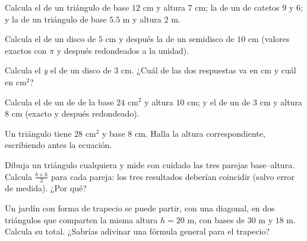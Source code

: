 \begin{exercise}[$\star$]\label{exo:g7:areas:3}
Calcula el  de un triángulo de base $12$ cm y altura $7$ cm;
la de un  de catetos $9$ y $6$; y la de un triángulo de base
$5.5$ m y altura $2$ m.
\end{exercise}

\begin{exercise}[$\star$]\label{exo:g7:areas:4}
Calcula el  de un disco de  $5$ cm y después la de un semidisco de
 $10$ cm (valores exactos con $\pi$ y después redondeados a la unidad).
\end{exercise}

\begin{exercise}[$\star$]\label{exo:g7:areas:5}
Calcula el  \emph{y} el  de un disco de  $3$ cm.
¿Cuál de las dos respuestas va en cm y cuál en cm$^2$?
\end{exercise}

\begin{exercise}[$\star$]\label{exo:g7:areas:6}
Calcula el  de un  de  de la base $24$ cm$^2$ y altura
$10$ cm; y el de un  de  $3$ cm y altura $8$ cm (exacto
y después redondeado).
\end{exercise}

\begin{exercise}[$\star$]\label{exo:g7:areas:7}
Un triángulo tiene  $28$ cm$^2$ y base $8$ cm. Halla la
altura correspondiente, escribiendo antes la ecuación.
\end{exercise}

\begin{exercise}[$\star\star$]\label{exo:g7:areas:8}
Dibuja un triángulo cualquiera y mide con cuidado las tres parejas base--altura.
Calcula $\frac{b \times h}{2}$ para cada pareja: los tres resultados deberían
coincidir (salvo error de medida). ¿Por qué?
\end{exercise}

\begin{exercise}[$\star\star$]\label{exo:g7:areas:9}
Un jardín con forma de trapecio se puede partir, con una diagonal, en dos
triángulos que comparten la misma altura $h = 20$ m, con bases de $30$ m y
$18$ m. Calcula su  total. ¿Sabrías adivinar una fórmula general para
el trapecio?
\end{exercise}

